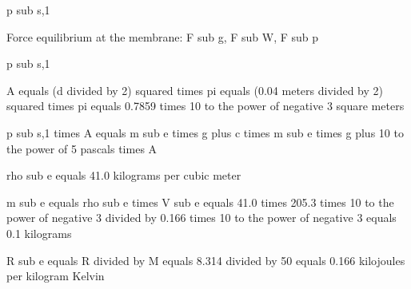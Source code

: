 p sub s,1

Force equilibrium at the membrane: 
F sub g, F sub W, F sub p

p sub s,1

A equals (d divided by 2) squared times pi equals (0.04 meters divided by 2) squared times pi equals 0.7859 times 10 to the power of negative 3 square meters

p sub s,1 times A equals m sub e times g plus c times m sub e times g plus 10 to the power of 5 pascals times A

rho sub e equals 41.0 kilograms per cubic meter

m sub e equals rho sub e times V sub e equals 41.0 times 205.3 times 10 to the power of negative 3 divided by 0.166 times 10 to the power of negative 3 equals 0.1 kilograms

R sub e equals R divided by M equals 8.314 divided by 50 equals 0.166 kilojoules per kilogram Kelvin